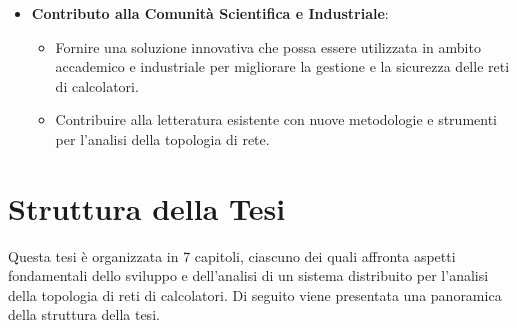 \documentclass[target=bach,aauheader=,style=]{thud}
\begin{document}
\begin{itemize}


  \item \textbf{Contributo alla Comunità Scientifica e Industriale}:
    \begin{itemize}
      \item Fornire una soluzione innovativa che possa essere utilizzata in ambito accademico e industriale per migliorare la gestione e la sicurezza delle reti di calcolatori.
      \item Contribuire alla letteratura esistente con nuove metodologie e strumenti per l'analisi della topologia di rete.
    \end{itemize}

\end{itemize}



\section{Struttura della Tesi}
Questa tesi è organizzata in 7 capitoli, ciascuno dei quali affronta aspetti fondamentali dello sviluppo e dell'analisi di un sistema distribuito per l'analisi della topologia di reti di calcolatori. Di seguito viene presentata una panoramica della struttura della tesi.
\end{document}
